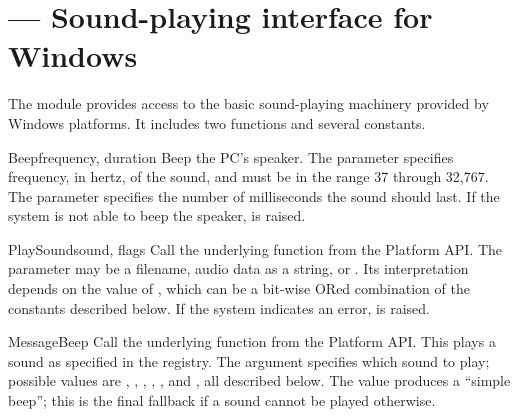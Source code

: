 \section{ ---
         Sound-playing interface for Windows}



The  module provides access to the basic
sound-playing machinery provided by Windows platforms.  It includes
two functions and several constants.


\begin{funcdesc}{Beep}{frequency, duration}
  Beep the PC's speaker.
  The  parameter specifies frequency, in hertz, of the
  sound, and must be in the range 37 through 32,767.
  The  parameter specifies the number of milliseconds the
  sound should last.  If the system is not
  able to beep the speaker,  is raised.
\end{funcdesc}

\begin{funcdesc}{PlaySound}{sound, flags}
  Call the underlying  function from the
  Platform API.  The  parameter may be a filename, audio
  data as a string, or .  Its interpretation depends on the
  value of , which can be a bit-wise ORed combination of
  the constants described below.  If the system indicates an error,
   is raised.
\end{funcdesc}

\begin{funcdesc}{MessageBeep}{}
  Call the underlying  function from the
  Platform API.  This plays a sound as specified in the registry.  The
   argument specifies which sound to play; possible values
  are , , ,
  , , and , all
  described below.  The value  produces a ``simple beep'';
  this is the final fallback if a sound cannot be played otherwise.
\end{funcdesc}

